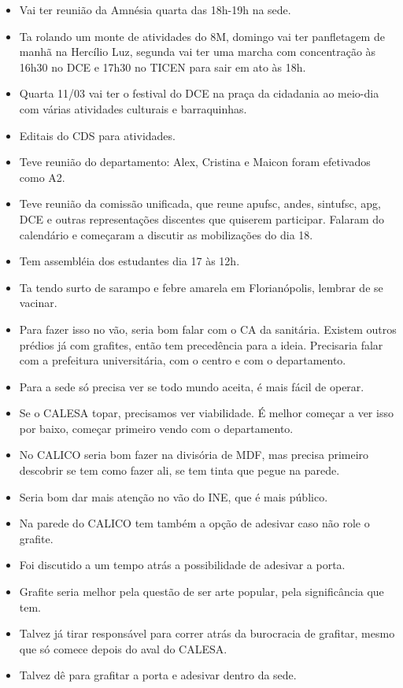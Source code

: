 \documentclass{ata-calico}
\begin{document}
\maketitle

\begin{itemize}
\item Vai ter reunião da Amnésia quarta das 18h-19h na sede.
\item Ta rolando um monte de atividades do 8M, domingo vai ter panfletagem de manhã na Hercílio Luz, segunda vai ter uma marcha com concentração às 16h30 no DCE e 17h30 no TICEN para sair em ato às 18h.
\item Quarta 11/03 vai ter o festival do DCE na praça da cidadania ao meio-dia com várias atividades culturais e barraquinhas.
\item Editais do CDS para atividades.
\item Teve reunião do departamento: Alex, Cristina e Maicon foram efetivados como A2.
\item Teve reunião da comissão unificada, que reune apufsc, andes, sintufsc, apg, DCE e outras representações discentes que quiserem participar. Falaram do calendário e começaram a discutir as mobilizações do dia 18.
\item Tem assembléia dos estudantes dia 17 às 12h.
\item Ta tendo surto de sarampo e febre amarela em Florianópolis, lembrar de se vacinar.
\end{itemize}

\begin{itemize}
\item Para fazer isso no vão, seria bom falar com o CA da sanitária. Existem outros prédios já com grafites, então tem precedência para a ideia. Precisaria falar com a prefeitura universitária, com o centro e com o departamento.
\item Para a sede só precisa ver se todo mundo aceita, é mais fácil de operar.
\item Se o CALESA topar, precisamos ver viabilidade. É melhor começar a ver isso por baixo, começar primeiro vendo com o departamento.
\item No CALICO seria bom fazer na divisória de MDF, mas precisa primeiro descobrir se tem como fazer ali, se tem tinta que pegue na parede.
\item Seria bom dar mais atenção no vão do INE, que é mais público.
\item Na parede do CALICO tem também a opção de adesivar caso não role o grafite.
\item Foi discutido a um tempo atrás a possibilidade de adesivar a porta.
\item Grafite seria melhor pela questão de ser arte popular, pela significância que tem.
\item Talvez já tirar responsável para correr atrás da burocracia de grafitar, mesmo que só comece depois do aval do CALESA.
\item Talvez dê para grafitar a porta e adesivar dentro da sede.
\end{itemize}
\end{document}
